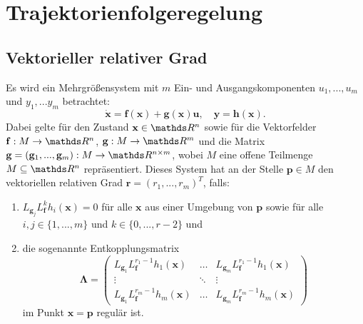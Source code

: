 \section{Trajektorienfolgeregelung}

\subsection{Vektorieller relativer Grad}
\label{sec:definition_relative_degree}
Es wird ein Mehrgrößensystem mit $m$ Ein- und Ausgangskomponenten $u_1, ..., u_m$ und $y_1, ... y_m$ betrachtet:
\begin{equation}
	\dot{\mathbf{x}} = \mathbf{f}(\mathbf{x}) + \mathbf{g}(\mathbf{x}) \mathbf{u}, \quad \mathbf{y} = \mathbf{h}(\mathbf{x}).
\end{equation}
Dabei gelte für den Zustand $\mathbf{x} \in \Reals^n$ sowie für die Vektorfelder $\mathbf{f}: M \rightarrow \Reals^n$, $\mathbf{g}: M \rightarrow \Reals^m$ und die Matrix $\mathbf{g} = (\mathbf{g}_1, ..., \mathbf{g}_m): M \rightarrow \Reals^{n \times m}$, wobei $M$ eine offene Teilmenge $M \subseteq \Reals^{n}$ repräsentiert. Dieses System hat an der Stelle $\mathbf{p} \in M$ den vektoriellen relativen Grad $\mathbf{r} = (r_1, ..., r_m)^T$, falls:
\begin{enumerate}
	\item $L_{\mathbf{g}_j} L_{\mathbf{f}}^k h_i(\mathbf{x}) = 0$ für alle $\mathbf{x}$ aus einer Umgebung von $\mathbf{p}$ sowie für alle $i,j \in \{1, ..., m\}$ und $k \in \{0, ..., r-2\}$ und
	\item die sogenannte Entkopplungsmatrix
	\begin{equation}
		\label{eq:decoupling_matrix}
		\boldsymbol{\Lambda} = 
		\left(\begin{matrix}
		L_{\mathbf{g}_1} L_{\mathbf{f}}^{r_1 -1} h_1(\mathbf{x}) & \hdots & L_{\mathbf{g}_m} L_{\mathbf{f}}^{r_1 -1} h_1(\mathbf{x}) \\
		\vdots & \ddots & \vdots \\
		L_{\mathbf{g}_1} L_{\mathbf{f}}^{r_m -1} h_m(\mathbf{x}) & \hdots & L_{\mathbf{g}_m} L_{\mathbf{f}}^{r_m -1} h_m(\mathbf{x})
		\end{matrix}\right) 
	\end{equation}
	im Punkt $\mathbf{x} = \mathbf{p}$ regulär ist.
\end{enumerate}
\cite[S. 194]{NLRT_Roebenack}

